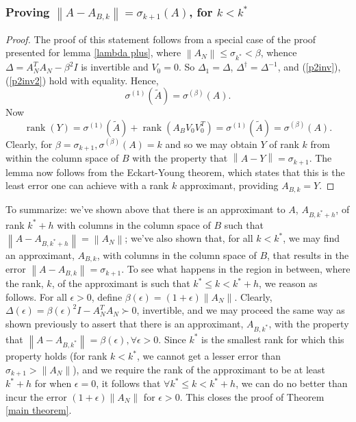 \documentclass[11pt]{article}
\newcommand{\rank}{\operatorname{rank}}
\newcommand{\norm}[1]{\left\|#1\right\|}
\begin{document}
\subsubsection{Proving $\norm{A - A_{B, k}} = \sigma_{k+1}(A)$, for $k < k^*$}
%
\begin{proof}
The proof of this statement follows from a special case of the proof presented for lemma \ref{lambda plus}, where $\norm{A_N} \leq \sigma_{k^*} < \beta$, whence $\Delta = A_N ^T A_N - \beta^2 I$ is invertible and $V_0 = 0$. So $\Delta_1 = \Delta$,  $\Delta^{\dagger} = \Delta^{-1}$, and (\ref{p2inv}), (\ref{p2inv2}) hold with equality. Hence, 
\[ \sigma^{(1)} (\tilde A) = \sigma^{(\beta)} (A). \]
Now 
\[ \rank(Y) = \sigma^{(1)} (\tilde A) + \rank(A_B V_0 V_0 ^T) = \sigma^{(1)} (\tilde A) = \sigma^{(\beta)} (A). \] 
Clearly, for $\beta = \sigma_{k+1}, \sigma^{(\beta)}(A) = k$ and so we may obtain $Y$ of rank $k$ from within the column space of $B$ with the property that $\norm{A - Y} = \sigma_{k+1}$. The lemma now follows from the Eckart-Young theorem, which states that this is the least error one can achieve with a rank $k$ approximant, providing $A_{B, k} = Y$.
\end{proof}
%
%
\noindent To summarize: we've shown above that there is an approximant to $A$, $A_{B, k^* + h}$, of rank $k^* + h$ with columns in the column space of $B$ such that $\norm{A - A_{B, k^* + h}} = \norm{A_N}$; we've also shown that, for all $k < k^*$, we may find an approximant, $A_{B, k}$, with columns in the column space of $B$, that results in the error $\norm{A - A_{B, k}} = \sigma_{k+1}$. To see what happens in the region in between, where the rank, $k$, of the approximant is such that $k^* \leq k < k^* + h$, we reason as follows. For all $\epsilon > 0$, define $\beta(\epsilon) = (1 + \epsilon) \norm{A_N}$. Clearly, $\Delta(\epsilon) = \beta(\epsilon) ^2 I - A_N ^T A_N \succ  0$, invertible, and we may proceed the same way as shown previously to assert that there is an approximant, $A_{B, k^*}$, with the property that $\norm{A - A_{B, k^*}} = \beta(\epsilon), \forall \epsilon > 0$. Since $k^*$ is the smallest rank for which this property holds (for rank $ k < k^*$, we cannot get a lesser error than $\sigma_{k+1} > \norm{A_N}$), and we require the rank of the approximant to be at least $k^* + h$ for when $\epsilon = 0$, it follows that $\forall k^* \leq k < k^* + h$, we can do no better than incur the error $(1 + \epsilon) \norm{A_N}$ for $\epsilon > 0$. This closes the proof of Theorem \ref{main theorem}.
\end{document}
